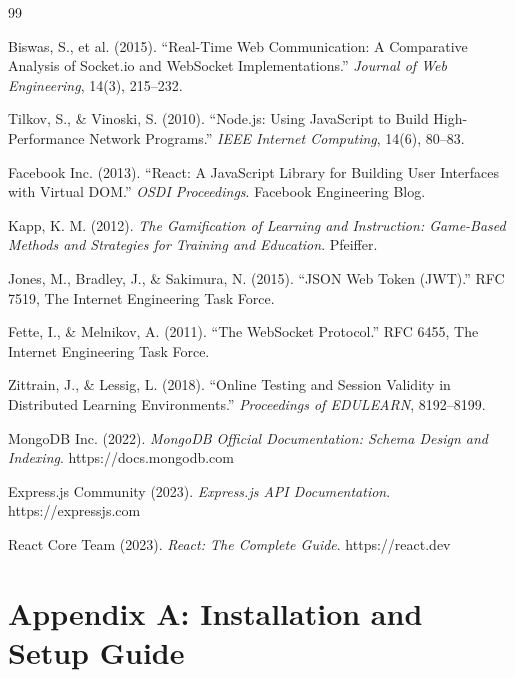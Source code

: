 \documentclass[12pt,a4paper]{report}
\begin{document}
\begin{thebibliography}{99}

Biswas, S., et al. (2015). ``Real-Time Web Communication: A Comparative Analysis of Socket.io and WebSocket Implementations.'' \textit{Journal of Web Engineering}, 14(3), 215--232.

Tilkov, S., \& Vinoski, S. (2010). ``Node.js: Using JavaScript to Build High-Performance Network Programs.'' \textit{IEEE Internet Computing}, 14(6), 80--83.

Facebook Inc. (2013). ``React: A JavaScript Library for Building User Interfaces with Virtual DOM.'' \textit{OSDI Proceedings}. Facebook Engineering Blog.

Kapp, K. M. (2012). \textit{The Gamification of Learning and Instruction: Game-Based Methods and Strategies for Training and Education}. Pfeiffer.

Jones, M., Bradley, J., \& Sakimura, N. (2015). ``JSON Web Token (JWT).'' RFC 7519, The Internet Engineering Task Force.

Fette, I., \& Melnikov, A. (2011). ``The WebSocket Protocol.'' RFC 6455, The Internet Engineering Task Force.

Zittrain, J., \& Lessig, L. (2018). ``Online Testing and Session Validity in Distributed Learning Environments.'' \textit{Proceedings of EDULEARN}, 8192--8199.

MongoDB Inc. (2022). \textit{MongoDB Official Documentation: Schema Design and Indexing}. https://docs.mongodb.com

Express.js Community (2023). \textit{Express.js API Documentation}. https://expressjs.com

React Core Team (2023). \textit{React: The Complete Guide}. https://react.dev

\end{thebibliography}

\cleardoublepage


\appendix

\chapter{Appendix A: Installation and Setup Guide}
\end{document}
